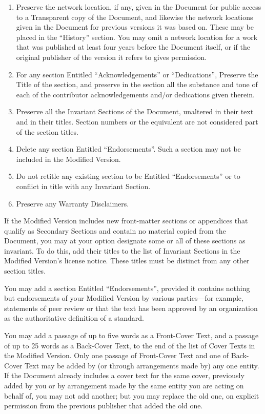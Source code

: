 \begin{enumerate}
\item    Preserve the network location, if any, given in
the Document for public access to a Transparent copy of the
Document, and likewise the network locations given in the
Document for previous versions it was based on. These may be
placed in the “History” section. You may omit a network
location for a work that was published at least four years
before the Document itself, or if the original publisher of
the version it refers to gives permission.

\item For any section Entitled “Acknowledgements”
or “Dedications”, Preserve the Title of the section,
and preserve in the section all the substance and tone of
each of the contributor acknowledgements and/or dedications
given therein.

\item    Preserve all the Invariant Sections of the Document,
unaltered in their text and in their titles. Section numbers or
the equivalent are not considered part of the section titles.

\item    Delete any section Entitled “Endorsements”. Such
a section may not be included in the Modified Version.

\item    Do not retitle any existing section to be Entitled
“Endorsements” or to conflict in title with any Invariant
Section.

\item    Preserve any Warranty Disclaimers. 
\end{enumerate}

If the Modified Version includes new front-matter sections
or appendices that qualify as Secondary Sections and contain
no material copied from the Document, you may at your option
designate some or all of these sections as invariant. To do
this, add their titles to the list of Invariant Sections in
the Modified Version’s license notice. These titles must
be distinct from any other section titles.

You may add a section Entitled “Endorsements”, provided
it contains nothing but endorsements of your Modified Version
by various parties—for example, statements of peer review
or that the text has been approved by an organization as the
authoritative definition of a standard.

You may add a passage of up to five words as a Front-Cover
Text, and a passage of up to 25 words as a Back-Cover Text,
to the end of the list of Cover Texts in the Modified
Version. Only one passage of Front-Cover Text and one of
Back-Cover Text may be added by (or through arrangements
made by) any one entity. If the Document already includes a
cover text for the same cover, previously added by you or by
arrangement made by the same entity you are acting on behalf
of, you may not add another; but you may replace the old one,
on explicit permission from the previous publisher that added
the old one.

